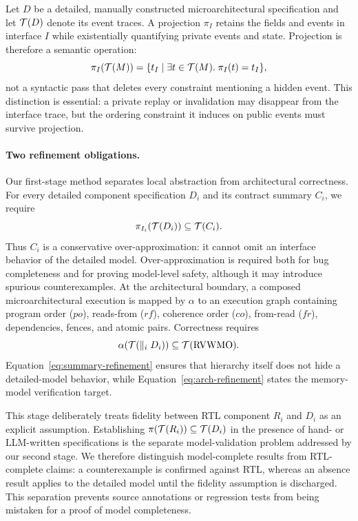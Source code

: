 Let $D$ be a detailed, manually constructed microarchitectural specification
and let $\mathcal{T}(D)$ denote its event traces.  A projection $\pi_I$ retains the
fields and events in interface $I$ while existentially quantifying private
events and state.  Projection is therefore a semantic operation:
\begin{equation}
  \pi_I(\mathcal{T}(M)) =
  \{t_I \mid \exists t\in\mathcal{T}(M).\;\pi_I(t)=t_I\},
  \label{eq:semantic-projection}
\end{equation}
not a syntactic pass that deletes every constraint mentioning a hidden event.
This distinction is essential: a private replay or invalidation may disappear
from the interface trace, but the ordering constraint it induces on public
events must survive projection.

\paragraph{Two refinement obligations.}
Our first-stage method separates local abstraction from architectural
correctness.  For every detailed component specification $D_i$ and its
contract summary $C_i$, we require
\begin{equation}
  \pi_{I_i}(\mathcal{T}(D_i)) \subseteq \mathcal{T}(C_i).
  \label{eq:summary-refinement}
\end{equation}
Thus $C_i$ is a conservative over-approximation: it cannot omit an interface
behavior of the detailed model.  Over-approximation is required both for bug
completeness and for proving model-level safety, although it may introduce
spurious counterexamples.
At the architectural boundary, a composed microarchitectural execution is
mapped by $\alpha$ to an execution graph containing program order ($po$),
reads-from ($rf$), coherence order ($co$), from-read ($fr$), dependencies,
fences, and atomic pairs.  Correctness requires
\begin{equation}
  \alpha\!\left(\mathcal{T}(\parallel_i D_i)\right)
  \subseteq \mathcal{T}(\mathrm{RVWMO}).
  \label{eq:arch-refinement}
\end{equation}
Equation~\ref{eq:summary-refinement} ensures that hierarchy itself does not
hide a detailed-model behavior, while Equation~\ref{eq:arch-refinement} states
the memory-model verification target.

This stage deliberately treats fidelity between RTL component $R_i$ and
$D_i$ as an explicit assumption.  Establishing
$\pi(\mathcal{T}(R_i))\subseteq\mathcal{T}(D_i)$ in the presence of hand- or
LLM-written specifications is the separate model-validation problem addressed
by our second stage.  We therefore distinguish model-complete results from
RTL-complete claims: a counterexample is confirmed against RTL, whereas an
absence result applies to the detailed model until the fidelity assumption is
discharged.  This separation prevents source annotations or regression tests
from being mistaken for a proof of model completeness.

